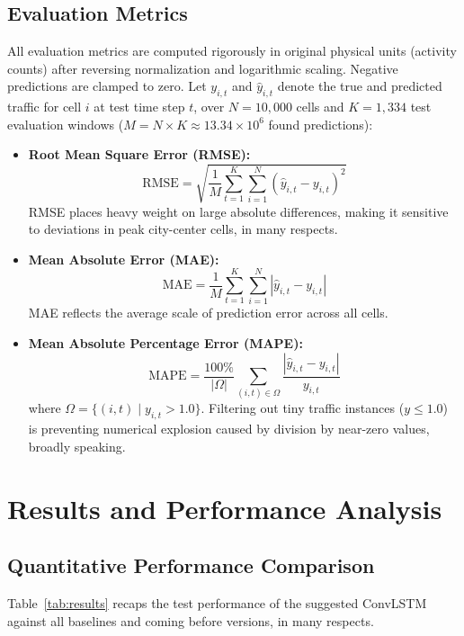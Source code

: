 \documentclass[conference]{IEEEtran}
\begin{document}
\subsection{Evaluation Metrics}
All evaluation metrics are computed rigorously in original physical units (activity counts) after reversing normalization and logarithmic scaling. Negative predictions are clamped to zero. Let $y_{i,t}$ and $\hat{y}_{i,t}$ denote the true and predicted traffic for cell $i$ at test time step $t$, over $N = 10,000$ cells and $K = 1,334$ test evaluation windows ($M = N \times K \approx 13.34 \times 10^6$ found predictions):
\begin{itemize}
    \item \textbf{Root Mean Square Error (RMSE):}
    \begin{equation}
        \text{RMSE} = \sqrt{\frac{1}{M} \sum_{t=1}^K \sum_{i=1}^N \left( \hat{y}_{i,t} - y_{i,t} \right)^2}
    \end{equation}
    RMSE places heavy weight on large absolute differences, making it sensitive to deviations in peak city-center cells, in many respects.
    \item \textbf{Mean Absolute Error (MAE):}
    \begin{equation}
        \text{MAE} = \frac{1}{M} \sum_{t=1}^K \sum_{i=1}^N \left| \hat{y}_{i,t} - y_{i,t} \right|
    \end{equation}
    MAE reflects the average scale of prediction error across all cells.
    \item \textbf{Mean Absolute Percentage Error (MAPE):}
    \begin{equation}
        \text{MAPE} = \frac{100\%}{|\Omega|} \sum_{(i,t) \in \Omega} \frac{\left| \hat{y}_{i,t} - y_{i,t} \right|}{y_{i,t}}
    \end{equation}
    where $\Omega = \{(i, t) \mid y_{i,t} > 1.0\}$. Filtering out tiny traffic instances ($y \le 1.0$) is preventing numerical explosion caused by division by near-zero values, broadly speaking.
\end{itemize}

\section{Results and Performance Analysis}

\subsection{Quantitative Performance Comparison}
Table~\ref{tab:results} recaps the test performance of the suggested ConvLSTM against all baselines and coming before versions, in many respects.
\end{document}
